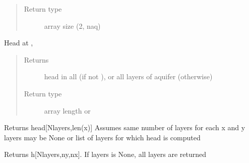 \documentclass[letterpaper,10pt,english]{sphinxmanual}
\begin{document}
\begin{fulllineitems}
\begin{fulllineitems}
\begin{quote}
\begin{description}
\item[{Return type}] \leavevmode
array size (2, naq)

\end{description}\end{quote}

\end{fulllineitems}


\begin{fulllineitems}
\label{\detokenize{models/modelmaq:timml.model.ModelMaq.head}}
Head at , 
\begin{quote}\begin{description}
\item[{Returns}] \leavevmode
{} \textendash{} head in all  (if not ), or all layers of aquifer (otherwise)

\item[{Return type}] \leavevmode
array length  or 

\end{description}\end{quote}

\end{fulllineitems}


\begin{fulllineitems}
\label{\detokenize{models/modelmaq:timml.model.ModelMaq.headalongline}}
Returns head{[}Nlayers,len(x){]}
Assumes same number of layers for each x and y
layers may be None or list of layers for which head is computed

\end{fulllineitems}


\begin{fulllineitems}
\label{\detokenize{models/modelmaq:timml.model.ModelMaq.headgrid}}
Returns h{[}Nlayers,ny,nx{]}.
If layers is None, all layers are returned


\end{fulllineitems}
\end{fulllineitems}
\end{document}
